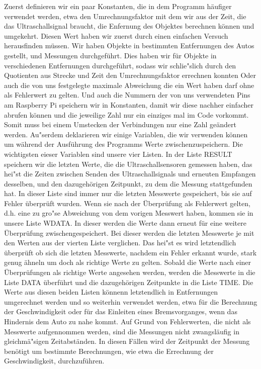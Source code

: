 \documentclass[a4paper,12pt]{article}
\begin{document}
Zuerst definieren wir ein paar Konstanten, die in dem Programm h\"aufiger verwendet werden, etwa den Umrechnungsfaktor mit
dem wir aus der Zeit, die das Ultraschallsignal braucht, die Enfernung des Objektes berechnen k\"onnen und umgekehrt.
Diesen Wert haben wir zuerst durch einen einfachen Versuch herausfinden m\"ussen. Wir haben Objekte in bestimmten
Entfernungen des Autos gestellt, und Messungen durchgef\"uhrt. Dies haben wir f\"ur Objekte in verschiedenen Entfernungen
durchgef\"uhrt, sodass wir schlie"slich durch den Quotienten aus Strecke und Zeit den Umrechnungsfaktor errechnen konnten
Oder auch die von uns festgelegte maximale Abweichung die ein Wert haben darf ohne als Fehlerwert zu gelten. Und auch
die Nummern der von uns verwendeten Pins am Raspberry Pi speichern wir in Konstanten, damit wir diese nachher einfacher
abrufen k\"onnen und die jeweilige Zahl nur ein einziges mal im Code vorkommt. Somit muss bei einem Umstecken der
Verbindungen nur eine Zahl ge\"andert werden.
\newline
Au"serdem deklarieren wir einige Variablen, die wir verwenden k\"onnen um w\"ahrend der Ausf\"uhrung des Programms Werte
zwischenzuspeichern. Die wichtigsten eieser Variablen sind unsere vier Listen. In der Liste RESULT speichern wir die
letzten Werte, die die Ultraschallsensoren gemessen haben, das hei"st die Zeiten zwischen Senden des Ultraschallsignals
und erneuten Empfangen desselben, und den dazugeh\"origen Zeitpunkt, zu dem die Messung stattgefunden hat. In dieser
Liste sind immer nur die letzten Messwerte gespeichert, bis sie auf Fehler \"uberpr\"uft wurden. Wenn sie nach der
\"Uberpr\"ufung als Fehlerwert gelten, d.h. eine zu gro"se Abweichung von dem vorigen Messwert haben, kommen sie in
unsere Liste WDATA. In dieser werden die Werte dann erneut f\"ur eine weitere \"Uberpr\"ufung zwischengespeichert. Bei
dieser werden die letzten Messwerte je mit den Werten aus der vierten Liste verglichen. Das hei"st es wird letztendlich
\"uberpr\"uft ob sich die letzten Messwerte, nachdem ein Fehler erkannt wurde, stark genug \"ahneln um doch als richtige
Werte zu gelten. Sobald die Werte nach einer \"Uberpr\"ufungen als richtige Werte angesehen werden, werden die Messwerte
in die Liste DATA \"uberf\"uhrt und die dazugeh\"origen Zeitpunkte in die Liste TIME. Die Werte aus diesen beiden Listen
k\"onnenn letztendlich in Entfernungen umgerechnet werden und so weiterhin verwendet werden, etwa f\"ur die Berechnung der
Geschwindigkeit oder f\"ur das Einleiten eines Bremsvorganges, wenn das Hindernis dem Auto zu nahe kommt. Auf Grund von
Fehlerwerten, die nicht als Messwerte aufgennommen werden, sind die Messungen nicht zwangsl\"aufig in gleichm\"a"sigen
Zeitabst\"anden. In diesen F\"allen wird der Zeitpunkt der Messung ben\"otigt um bestimmte Berechnungen, wie etwa die
Errechnung der Geschwindigkeit, durchzuf\"uhren.
\end{document}
